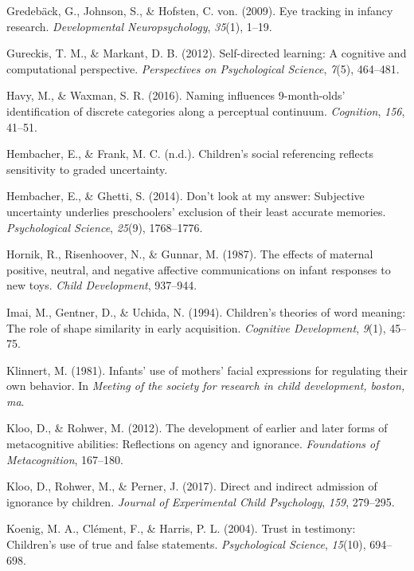 \documentclass[floatsintext,man]{apa6}
\theoremstyle{definition}
\theoremstyle{definition}
\theoremstyle{definition}
\theoremstyle{remark}
\begin{document}
\hypertarget{ref-gredeback2009eye}{}
Gredebäck, G., Johnson, S., \& Hofsten, C. von. (2009). Eye tracking in
infancy research. \emph{Developmental Neuropsychology}, \emph{35}(1),
1--19.

\hypertarget{ref-gureckis2012self}{}
Gureckis, T. M., \& Markant, D. B. (2012). Self-directed learning: A
cognitive and computational perspective. \emph{Perspectives on
Psychological Science}, \emph{7}(5), 464--481.

\hypertarget{ref-havy2016naming}{}
Havy, M., \& Waxman, S. R. (2016). Naming influences 9-month-olds'
identification of discrete categories along a perceptual continuum.
\emph{Cognition}, \emph{156}, 41--51.

\hypertarget{ref-hembacherchildren}{}
Hembacher, E., \& Frank, M. C. (n.d.). Children's social referencing
reflects sensitivity to graded uncertainty.

\hypertarget{ref-hembacher2014don}{}
Hembacher, E., \& Ghetti, S. (2014). Don't look at my answer: Subjective
uncertainty underlies preschoolers' exclusion of their least accurate
memories. \emph{Psychological Science}, \emph{25}(9), 1768--1776.

\hypertarget{ref-hornik1987effects}{}
Hornik, R., Risenhoover, N., \& Gunnar, M. (1987). The effects of
maternal positive, neutral, and negative affective communications on
infant responses to new toys. \emph{Child Development}, 937--944.

\hypertarget{ref-imai1994children}{}
Imai, M., Gentner, D., \& Uchida, N. (1994). Children's theories of word
meaning: The role of shape similarity in early acquisition.
\emph{Cognitive Development}, \emph{9}(1), 45--75.

\hypertarget{ref-klinnert1981infants}{}
Klinnert, M. (1981). Infants' use of mothers' facial expressions for
regulating their own behavior. In \emph{Meeting of the society for
research in child development, boston, ma}.

\hypertarget{ref-kloo2012development}{}
Kloo, D., \& Rohwer, M. (2012). The development of earlier and later
forms of metacognitive abilities: Reflections on agency and ignorance.
\emph{Foundations of Metacognition}, 167--180.

\hypertarget{ref-kloo2017direct}{}
Kloo, D., Rohwer, M., \& Perner, J. (2017). Direct and indirect
admission of ignorance by children. \emph{Journal of Experimental Child
Psychology}, \emph{159}, 279--295.

\hypertarget{ref-koenig2004trust}{}
Koenig, M. A., Clément, F., \& Harris, P. L. (2004). Trust in testimony:
Children's use of true and false statements. \emph{Psychological
Science}, \emph{15}(10), 694--698.
\end{document}
